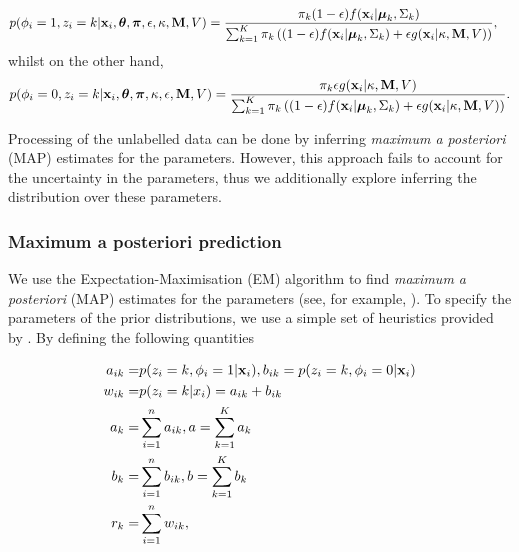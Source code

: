 \documentclass[10pt,letterpaper]{article}\usepackage[]{graphicx}\usepackage[]{color}
\begin{document}
\begin{equation}\label{equation::estep1}
\begin{split}
p(\phi_i = 1, z_i = k|{\bf x}_i, \boldsymbol{\theta}, \boldsymbol{\pi} , \epsilon,\kappa, {\bf M}, V)  & = \frac{\pi_k(1-\epsilon)f({\bf x}_i|\boldsymbol{\mu}_k, \Sigma_{k})}{\sum_{k=1}^{K}\pi_k\left((1-\epsilon) f({\bf x}_i|\boldsymbol{\mu}_k, \Sigma_k) + \epsilon g({\bf x}_i|\kappa, {\bf M}, V)\right)},
\end{split}
\end{equation}
whilst on the other hand,
\begin{equation}\label{equation::estep2}
\begin{split}
p(\phi_i = 0, z_i = k|{\bf x}_i, \boldsymbol{\theta}, \boldsymbol{\pi},\kappa, \epsilon, {\bf M}, V)  = \frac{\pi_k \epsilon g({\bf x}_i|\kappa, {\bf M}, V)}{\sum_{k=1}^{K}\pi_k\left((1-\epsilon) f({\bf x}_i|\boldsymbol{\mu}_k, \Sigma_k) + \epsilon g({\bf x}_i|\kappa, {\bf M}, V)\right)}.
\end{split}
\end{equation}

Processing of the unlabelled data can be done by inferring {\em maximum
  a posteriori} (MAP) estimates for the parameters. However, this
approach fails to account for the uncertainty in the parameters, thus
we additionally explore inferring the distribution over these
parameters.

\subsubsection*{Maximum a posteriori prediction}

We use the Expectation-Maximisation (EM) algorithm \cite{EM:1977} to
find {\em maximum a posteriori} (MAP) estimates for the parameters
(see, for example, \cite{Murphy:2012}). To specify the parameters of
the prior distributions, we use a simple set of heuristics provided by
\cite{Fraley:2007}. By defining the following quantities

\begin{equation}\label{equation::estepfinal}
\begin{split}
a_{ik} = & p(z_i = k, \phi_i = 1|{\bf x}_i), b_{ik} = p(z_i = k, \phi_i = 0|{\bf x}_i) \\
w_{ik} = & p(z_i = k|x_i) = a_{ik} + b_{ik}\\
a_k = & \sum_{i=1}^{n}a_{ik}, a = \sum_{k=1}^{K}a_k \\
b_k = & \sum_{i=1}^{n}b_{ik}, b = \sum_{k=1}^{K}b_k \\
r_k = & \sum_{i=1}^{n}w_{ik},
\end{split}
\end{equation}
\end{document}
